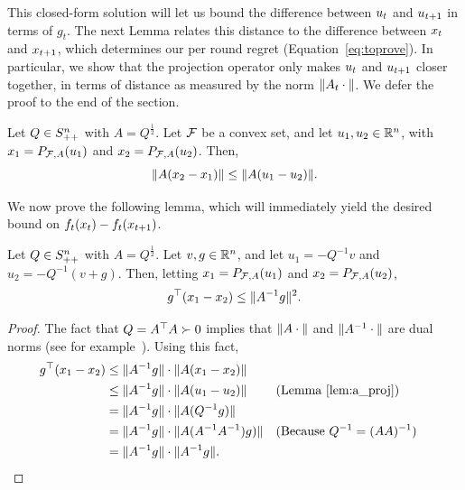 This closed-form solution will let us bound the difference between
$u_t$ and $u_{t+1}$ in terms of $g_t$.  The next Lemma relates this
distance to the difference between $x_t$ and $x_{t+1}$, which determines
our per round regret (Equation~\eqref{eq:toprove}).  In particular, we
show that the projection operator only makes $u_t$ and $u_{t+1}$ closer
together, in terms of distance as measured by the norm $\| A_t
\cdot \|$.  We defer the proof to the end of the section.

\begin{lemma}\label{lem:a_proj}
Let $Q \in S^n_{++}$ with $A = Q^\frac{1}{2}$.  Let $\mathcal{F}$ be a convex
set, and let $u_1, u_2 \in
\mathbb{R}^n$, with $x_1 = P_{\mathcal{F},A}(u_1)$ and $x_2 = P_{\mathcal{F},A}(u_2)$.  Then,
\[\| A (x_2 - x_1) \| \leq \| A(u_1 - u_2) \|.\]
\end{lemma}

We now prove the following lemma, which will immediately yield the
desired bound on $f_t (x_t) - f_t(x_{t+1})$.

\newcommand{\PFAt}{\Proj_{\Fs,A}}

\begin{lemma}\label{lem:not_btarl_term}
Let $Q \in S^n_{++}$ with $A = Q^\frac{1}{2}$.  Let $v, g \in \mathbb{R}^n$, and
let $u_1 = -Q^{-1} v$ and $u_2 = -Q^{-1} (v + g)$. Then, letting $x_1
= \PFAt(u_1)$ and $x_2 = \PFAt(u_2)$,
\[ g^\top (x_1 - x_2) \leq \| A^{-1} g \|^2.\]
\end{lemma}
\begin{proof}
The fact that $Q = A^\top A \succ 0$ implies that
$\| A \cdot \|$ and $\| A^{-1}\cdot \|$ are dual norms (see
for example~\cite[Sec. 9.4.1, pg. 476]{boyd}).  Using this fact,
\begin{align*}
 g^\top (x_1 - x_2)
  &\leq \| A^{-1} g \| \cdot \| A (x_1 - x_2) \|\\
  &\leq \| A^{-1} g \| \cdot \| A (u_1 - u_2) \|
         && \text{(Lemma~\ref{lem:a_proj})}\\
  &= \| A^{-1} g \| \cdot \| A (Q^{-1} g) \| \\
  &= \| A^{-1} g \| \cdot \| A (A^{-1}A^{-1}) g) \| 
      && \text{(Because $Q^{-1} = (A A)^{-1}$)}\\
  &= \| A^{-1} g \| \cdot \| A^{-1} g \|. 
\end{align*}
\end{proof}

